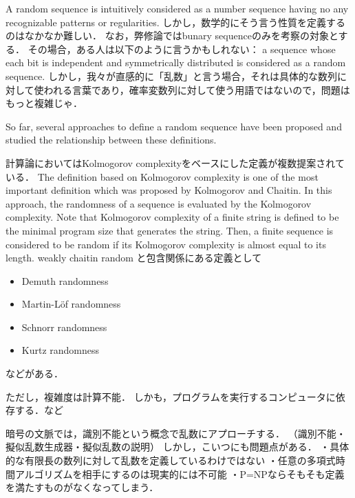 A random sequence is intuitively considered as a number sequence having no any recognizable patterns or regularities. 
しかし，数学的にそう言う性質を定義するのはなかなか難しい．
なお，弊修論ではbunary sequenceのみを考察の対象とする．
その場合，ある人は以下のように言うかもしれない： a sequence whose each bit is independent and symmetrically distributed is considered as a random sequence. 
しかし，我々が直感的に「乱数」と言う場合，それは具体的な数列に対して使われる言葉であり，確率変数列に対して使う用語ではないので，問題はもっと複雑じゃ．

%
So far, several approaches to define a random sequence have been proposed and studied the relationship between these definitions. 


計算論においてはKolmogorov complexityをベースにした定義が複数提案されている．
The definition based on Kolmogorov complexity is one of the most important definition which was proposed by Kolmogorov \cite{kolmogorov1968three} and Chaitin\cite{chaitin1966length,chaitin1969length,chaitin1975theory}. 
%
In this approach, the randomness of a sequence is evaluated by the Kolmogorov complexity. Note that Kolmogorov complexity of a finite string is defined to be the minimal program size that generates the string. Then, a finite sequence is considered to be random if its Kolmogorov complexity is almost equal to its length.
%
weakly chaitin random と包含関係にある定義として
\begin{itemize}
  \item Demuth randomness \cite{demuth1988remarks}
  \item Martin-L\"{o}f randomness \cite{martin1966definition,martin1971complexity}
  \item Schnorr randomness \cite{schnorr1971unified,schnorr1973process,schnorr1977general}
  \item Kurtz randomness \cite{kautz1991degrees}
\end{itemize}
などがある．

ただし，複雑度は計算不能．
しかも，プログラムを実行するコンピュータに依存する．など

暗号の文脈では，識別不能という概念で乱数にアプローチする．
（識別不能・擬似乱数生成器・擬似乱数の説明）
しかし，こいつにも問題点がある．
・具体的な有限長の数列に対して乱数を定義しているわけではない
・任意の多項式時間アルゴリズムを相手にするのは現実的には不可能
・P=NPならそもそも定義を満たすものがなくなってしまう．

